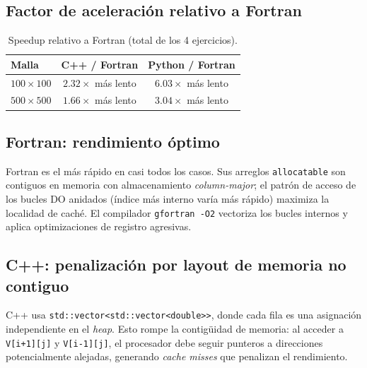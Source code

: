 \documentclass[12pt, a4paper]{article}
\begin{document}
\subsection{Factor de aceleración relativo a Fortran}

\begin{table}[H]
  \centering
  \caption{Speedup relativo a Fortran (total de los 4 ejercicios).}
  \label{tab:speedup}
  \begin{tabular}{lcc}
    \toprule
    \textbf{Malla} & \textbf{C++ / Fortran} & \textbf{Python / Fortran} \\
    \midrule
    $100\times100$ & $2.32\times$ más lento & $6.03\times$ más lento \\
    $500\times500$ & $1.66\times$ más lento & $3.04\times$ más lento \\
    \bottomrule
  \end{tabular}
\end{table}

\subsection{Fortran: rendimiento óptimo}

Fortran es el más rápido en casi todos los casos. Sus arreglos
\texttt{allocatable} son contiguos en memoria con almacenamiento
\emph{column-major}; el patrón de acceso de los bucles DO anidados
(índice más interno varía más rápido) maximiza la localidad de caché.
El compilador \texttt{gfortran -O2} vectoriza los bucles internos y
aplica optimizaciones de registro agresivas.

\subsection{C++: penalización por layout de memoria no contiguo}

C++ usa \texttt{std::vector<std::vector<double>>}, donde cada fila es una
asignación independiente en el \emph{heap}. Esto rompe la contigüidad de
memoria: al acceder a \texttt{V[i+1][j]} y \texttt{V[i-1][j]}, el procesador
debe seguir punteros a direcciones potencialmente alejadas, generando
\emph{cache misses} que penalizan el rendimiento.
\end{document}
